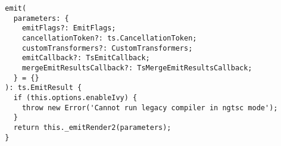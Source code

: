 \begin{verbatim}
  emit(
    parameters: {
      emitFlags?: EmitFlags;
      cancellationToken?: ts.CancellationToken;
      customTransformers?: CustomTransformers;
      emitCallback?: TsEmitCallback;
      mergeEmitResultsCallback?: TsMergeEmitResultsCallback;
    } = {}
  ): ts.EmitResult {
    if (this.options.enableIvy) {
      throw new Error('Cannot run legacy compiler in ngtsc mode');
    }
    return this._emitRender2(parameters);
  }
\end{verbatim}

